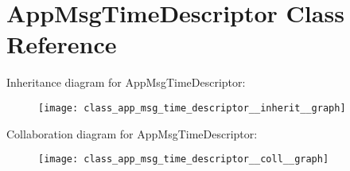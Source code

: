 \hypertarget{class_app_msg_time_descriptor}{}\section{App\+Msg\+Time\+Descriptor Class Reference}
\label{class_app_msg_time_descriptor}


Inheritance diagram for App\+Msg\+Time\+Descriptor\+:
\nopagebreak
\begin{figure}[H]
\begin{center}
\leavevmode
\texttt{[image: class\_app\_msg\_time\_descriptor\_\_inherit\_\_graph]}
\end{center}
\end{figure}


Collaboration diagram for App\+Msg\+Time\+Descriptor\+:
\nopagebreak
\begin{figure}[H]
\begin{center}
\leavevmode
\texttt{[image: class\_app\_msg\_time\_descriptor\_\_coll\_\_graph]}
\end{center}
\end{figure}

